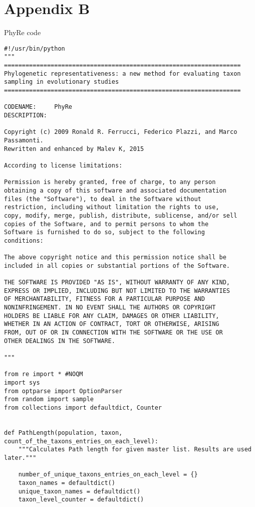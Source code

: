 \documentclass[a4paper,11pt]{article}
\begin{document}
\section{Appendix B}
PhyRe code
\begin{lstlisting}
#!/usr/bin/python
"""
==================================================================
Phylogenetic representativeness: a new method for evaluating taxon
sampling in evolutionary studies
==================================================================

CODENAME:     PhyRe
DESCRIPTION:

Copyright (c) 2009 Ronald R. Ferrucci, Federico Plazzi, and Marco Passamonti.
Rewritten and enhanced by Malev K, 2015

According to license limitations:

Permission is hereby granted, free of charge, to any person
obtaining a copy of this software and associated documentation
files (the "Software"), to deal in the Software without
restriction, including without limitation the rights to use,
copy, modify, merge, publish, distribute, sublicense, and/or sell
copies of the Software, and to permit persons to whom the
Software is furnished to do so, subject to the following
conditions:

The above copyright notice and this permission notice shall be
included in all copies or substantial portions of the Software.

THE SOFTWARE IS PROVIDED "AS IS", WITHOUT WARRANTY OF ANY KIND,
EXPRESS OR IMPLIED, INCLUDING BUT NOT LIMITED TO THE WARRANTIES
OF MERCHANTABILITY, FITNESS FOR A PARTICULAR PURPOSE AND
NONINFRINGEMENT. IN NO EVENT SHALL THE AUTHORS OR COPYRIGHT
HOLDERS BE LIABLE FOR ANY CLAIM, DAMAGES OR OTHER LIABILITY,
WHETHER IN AN ACTION OF CONTRACT, TORT OR OTHERWISE, ARISING
FROM, OUT OF OR IN CONNECTION WITH THE SOFTWARE OR THE USE OR
OTHER DEALINGS IN THE SOFTWARE.

"""

from re import * #NOQM
import sys
from optparse import OptionParser
from random import sample
from collections import defaultdict, Counter


def PathLength(population, taxon, count_of_the_taxons_entries_on_each_level):
    """Calculates Path length for given master list. Results are used later."""

    number_of_unique_taxons_entries_on_each_level = {}
    taxon_names = defaultdict()
    unique_taxon_names = defaultdict()
    taxon_level_counter = defaultdict()


\end{lstlisting}
\end{document}
